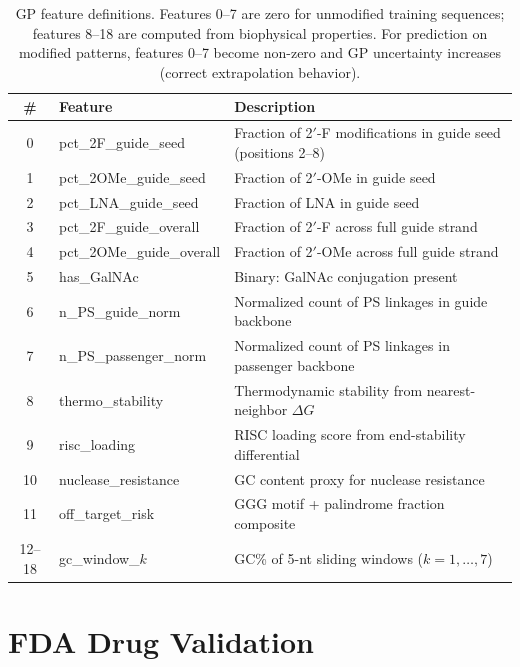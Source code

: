 \documentclass{article}
\begin{document}
\begin{table}[h]
\caption{GP feature definitions. Features 0--7 are zero for unmodified training sequences; features 8--18 are computed from biophysical properties. For prediction on modified patterns, features 0--7 become non-zero and GP uncertainty increases (correct extrapolation behavior).}
\label{tab:features}
\centering
\small
\begin{tabular}{@{}clp{7.5cm}@{}}
\toprule
\textbf{\#} & \textbf{Feature} & \textbf{Description} \\
\midrule
0 & pct\_2F\_guide\_seed & Fraction of 2$'$-F modifications in guide seed (positions 2--8) \\
1 & pct\_2OMe\_guide\_seed & Fraction of 2$'$-OMe in guide seed \\
2 & pct\_LNA\_guide\_seed & Fraction of LNA in guide seed \\
3 & pct\_2F\_guide\_overall & Fraction of 2$'$-F across full guide strand \\
4 & pct\_2OMe\_guide\_overall & Fraction of 2$'$-OMe across full guide strand \\
5 & has\_GalNAc & Binary: GalNAc conjugation present \\
6 & n\_PS\_guide\_norm & Normalized count of PS linkages in guide backbone \\
7 & n\_PS\_passenger\_norm & Normalized count of PS linkages in passenger backbone \\
8 & thermo\_stability & Thermodynamic stability from nearest-neighbor $\Delta G$ \\
9 & risc\_loading & RISC loading score from end-stability differential \\
10 & nuclease\_resistance & GC content proxy for nuclease resistance \\
11 & off\_target\_risk & GGG motif + palindrome fraction composite \\
12--18 & gc\_window\_$k$ & GC\% of 5-nt sliding windows ($k=1,\ldots,7$) \\
\bottomrule
\end{tabular}
\end{table}

\section{FDA Drug Validation}
\label{app:fda}
\end{document}
